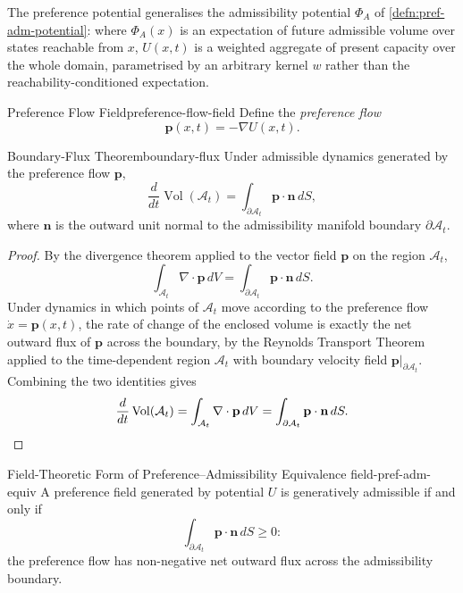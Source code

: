 \documentclass[12pt,twoside,openright]{book}
\newcommand{\Vol}{\operatorname{Vol}}
\begin{document}
The preference potential generalises the admissibility
potential $\Phi_A$ of \cref{defn:pref-adm-potential}: where
$\Phi_A(x)$ is an expectation of future admissible volume
over states reachable from $x$, $U(x,t)$ is a weighted
aggregate of present capacity over the whole domain,
parametrised by an arbitrary kernel $w$ rather than the
reachability-conditioned expectation.

\begin{definition}{Preference Flow Field}{preference-flow-field}
  Define the \emph{preference flow}
  \[
    \mathbf{p}(x,t) = -\nabla U(x,t).
  \]
\end{definition}

\begin{theorem}{Boundary-Flux Theorem}{boundary-flux}
  Under admissible dynamics generated by the preference
  flow $\mathbf{p}$,
  \[
    \frac{d}{dt}\Vol(\mathcal{A}_t)
    = \int_{\partial\mathcal{A}_t} \mathbf{p}\cdot\mathbf{n}\,dS,
  \]
  where $\mathbf{n}$ is the outward unit normal to the
  admissibility manifold boundary $\partial\mathcal{A}_t$.
\end{theorem}

\begin{proof}
  By the divergence theorem applied to the vector field
  $\mathbf{p}$ on the region $\mathcal{A}_t$,
  \[
    \int_{\mathcal{A}_t} \nabla\cdot\mathbf{p}\,dV
    = \int_{\partial\mathcal{A}_t} \mathbf{p}\cdot\mathbf{n}\,dS.
  \]
  Under dynamics in which points of $\mathcal{A}_t$ move
  according to the preference flow $\dot{x}=\mathbf{p}(x,t)$,
  the rate of change of the enclosed volume is exactly the
  net outward flux of $\mathbf{p}$ across the boundary, by
  the Reynolds Transport Theorem applied to the
  time-dependent region $\mathcal{A}_t$ with boundary
  velocity field $\mathbf{p}|_{\partial\mathcal{A}_t}$.
  Combining the two identities gives
  \[
    \frac{d}{dt}\Vol(\mathcal{A}_t)
    = \int_{\mathcal{A}_t} \nabla\cdot\mathbf{p}\,dV
    = \int_{\partial\mathcal{A}_t} \mathbf{p}\cdot\mathbf{n}\,dS. \qedhere
  \]
\end{proof}

\begin{corollary}{Field-Theoretic Form of Preference--Admissibility Equivalence}%
  {field-pref-adm-equiv}
  A preference field generated by potential $U$ is
  generatively admissible if and only if
  \[
    \int_{\partial\mathcal{A}_t} \mathbf{p}\cdot\mathbf{n}\,dS \ge 0:
  \]
  the preference flow has non-negative net outward flux
  across the admissibility boundary.
\end{corollary}
\end{document}
